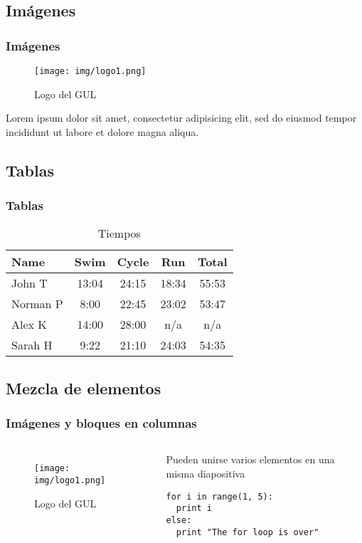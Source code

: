 \documentclass[aspectratio=43]{beamer}
\begin{document}
\subsection{Imágenes}

\begin{frame}
    \frametitle{Imágenes}
    \begin{figure}
        \texttt{[image: img/logo1.png]}
        \caption{Logo del GUL}
    \end{figure}
    Lorem ipsum dolor sit amet, consectetur adipisicing elit, sed do eiusmod tempor incididunt ut labore et dolore magna aliqua.
\end{frame}

\subsection{Tablas}

\begin{frame}
    \frametitle{Tablas}
    \begin{table}
        \begin{tabular}{l | c | c | c | c }
            Name & Swim & Cycle & Run & Total \\
            \hline \hline
            John T & 13:04 & 24:15 & 18:34 & 55:53 \\ 
            Norman P & 8:00 & 22:45 & 23:02 & 53:47\\
            Alex K & 14:00 & 28:00 & n/a & n/a\\
            Sarah H & 9:22 & 21:10 & 24:03 & 54:35 
        \end{tabular}
        \caption{Tiempos}
    \end{table}
\end{frame}

\subsection{Mezcla de elementos}

\begin{frame}[fragile]
    \frametitle{Imágenes y bloques en columnas}
    \begin{columns}
            \begin{figure}
                \texttt{[image: img/logo1.png]}
                \caption{Logo del GUL}
            \end{figure}
            \begin{block}{Pueden unirse varios elementos en una misma diapositiva} %
                \begin{verbatim}
for i in range(1, 5):
  print i
else:
  print "The for loop is over"
                \end{verbatim}
            \end{block}
    \end{columns}
\end{frame}
\end{document}
